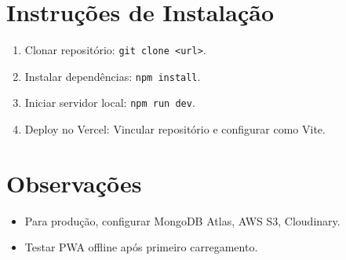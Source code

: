 \documentclass[a4paper,12pt]{article}
\begin{document}
\section{Instruções de Instalação}
\begin{enumerate}
    \item Clonar repositório: \texttt{git clone <url>}.
    \item Instalar dependências: \texttt{npm install}.
    \item Iniciar servidor local: \texttt{npm run dev}.
    \item Deploy no Vercel: Vincular repositório e configurar como Vite.
\end{enumerate}

\section{Observações}
\begin{itemize}
    \item Para produção, configurar MongoDB Atlas, AWS S3, Cloudinary.
    \item Testar PWA offline após primeiro carregamento.
\end{itemize}
\end{document}
